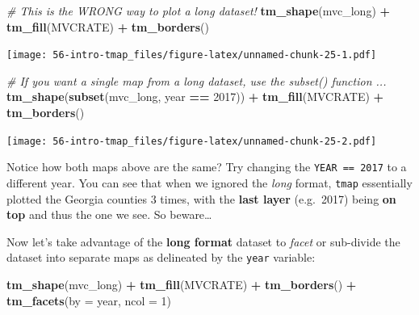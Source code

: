 \documentclass[
]{book}
\newenvironment{Shaded}{\begin{snugshade}}{\end{snugshade}}
\newcommand{\AttributeTok}[1]{\textcolor[rgb]{0.13,0.29,0.53}{#1}}
\newcommand{\CommentTok}[1]{\textcolor[rgb]{0.56,0.35,0.01}{\textit{#1}}}
\newcommand{\DecValTok}[1]{\textcolor[rgb]{0.00,0.00,0.81}{#1}}
\newcommand{\FunctionTok}[1]{\textcolor[rgb]{0.13,0.29,0.53}{\textbf{#1}}}
\newcommand{\NormalTok}[1]{#1}
\newcommand{\SpecialCharTok}[1]{\textcolor[rgb]{0.81,0.36,0.00}{\textbf{#1}}}
\newcommand{\StringTok}[1]{\textcolor[rgb]{0.31,0.60,0.02}{#1}}
\begin{document}
\begin{Shaded}
\begin{Highlighting}[]
\CommentTok{\# This is the WRONG way to plot a long dataset!}
\FunctionTok{tm\_shape}\NormalTok{(mvc\_long) }\SpecialCharTok{+}
  \FunctionTok{tm\_fill}\NormalTok{(}\StringTok{\textquotesingle{}MVCRATE\textquotesingle{}}\NormalTok{) }\SpecialCharTok{+}
  \FunctionTok{tm\_borders}\NormalTok{()}
\end{Highlighting}
\end{Shaded}

\texttt{[image: 56-intro-tmap\_files/figure-latex/unnamed-chunk-25-1.pdf]}

\begin{Shaded}
\begin{Highlighting}[]
\CommentTok{\# If you want a single map from a long dataset, use the subset() function ...}
\FunctionTok{tm\_shape}\NormalTok{(}\FunctionTok{subset}\NormalTok{(mvc\_long, year }\SpecialCharTok{==} \DecValTok{2017}\NormalTok{)) }\SpecialCharTok{+}
  \FunctionTok{tm\_fill}\NormalTok{(}\StringTok{\textquotesingle{}MVCRATE\textquotesingle{}}\NormalTok{) }\SpecialCharTok{+}
  \FunctionTok{tm\_borders}\NormalTok{()}
\end{Highlighting}
\end{Shaded}

\texttt{[image: 56-intro-tmap\_files/figure-latex/unnamed-chunk-25-2.pdf]}

Notice how both maps above are the same? Try changing the \texttt{YEAR\ ==\ 2017} to a different year. You can see that when we ignored the \emph{long} format, \texttt{tmap} essentially plotted the Georgia counties 3 times, with the \textbf{last layer} (e.g.~2017) being \textbf{on top} and thus the one we see. So beware\ldots{}

Now let's take advantage of the \textbf{long format} dataset to \emph{facet} or sub-divide the dataset into separate maps as delineated by the \texttt{year} variable:

\begin{Shaded}
\begin{Highlighting}[]
\FunctionTok{tm\_shape}\NormalTok{(mvc\_long) }\SpecialCharTok{+}
  \FunctionTok{tm\_fill}\NormalTok{(}\StringTok{\textquotesingle{}MVCRATE\textquotesingle{}}\NormalTok{) }\SpecialCharTok{+} 
  \FunctionTok{tm\_borders}\NormalTok{() }\SpecialCharTok{+}
\FunctionTok{tm\_facets}\NormalTok{(}\AttributeTok{by =} \StringTok{\textquotesingle{}year\textquotesingle{}}\NormalTok{, }\AttributeTok{ncol =} \DecValTok{1}\NormalTok{)}
\end{Highlighting}
\end{Shaded}
\end{document}
